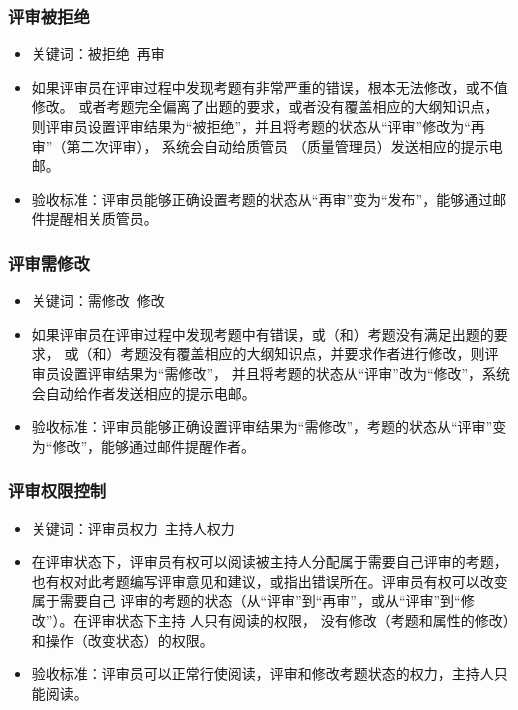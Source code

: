\documentclass[hyperref, a4paper]{ctexart}
\providecommand{\tightlist}{%
  \setlength{\itemsep}{0pt}\setlength{\parskip}{0pt}}
\begin{document}
\hypertarget{ux8bc4ux5ba1ux88abux62d2ux7edd}{%
\subsubsection{评审被拒绝}\label{ux8bc4ux5ba1ux88abux62d2ux7edd}}

\begin{itemize}
\tightlist
\item
  关键词：被拒绝~再审
\item
  如果评审员在评审过程中发现考题有非常严重的错误，根本无法修改，或不值修改。
  或者考题完全偏离了出题的要求，或者没有覆盖相应的大纲知识点，
  则评审员设置评审结果为``被拒绝''，并且将考题的状态从``评审''修改为``再审''（第二次评审），
  系统会自动给质管员 （质量管理员）发送相应的提示电邮。
\item
  验收标准：评审员能够正确设置考题的状态从``再审''变为``发布''，能够通过邮件提醒相关质管员。
\end{itemize}

\hypertarget{ux8bc4ux5ba1ux9700ux4feeux6539}{%
\subsubsection{评审需修改}\label{ux8bc4ux5ba1ux9700ux4feeux6539}}

\begin{itemize}
\tightlist
\item
  关键词：需修改~修改
\item
  如果评审员在评审过程中发现考题中有错误，或（和）考题没有满足出题的要求，
  或（和）考题没有覆盖相应的大纲知识点，并要求作者进行修改，则评审员设置评审结果为``需修改''，
  并且将考题的状态从``评审''改为``修改''，系统会自动给作者发送相应的提示电邮。
\item
  验收标准：评审员能够正确设置评审结果为``需修改''，考题的状态从``评审''变为``修改''，能够通过邮件提醒作者。
\end{itemize}

\hypertarget{ux8bc4ux5ba1ux6743ux9650ux63a7ux5236}{%
\subsubsection{评审权限控制}\label{ux8bc4ux5ba1ux6743ux9650ux63a7ux5236}}

\begin{itemize}
\tightlist
\item
  关键词：评审员权力~主持人权力
\item
  在评审状态下，评审员有权可以阅读被主持人分配属于需要自己评审的考题，
  也有权对此考题编写评审意见和建议，或指出错误所在。评审员有权可以改变属于需要自己
  评审的考题的状态（从``评审''到``再审''，或从``评审''到``修改''）。在评审状态下主持
  人只有阅读的权限，
  没有修改（考题和属性的修改）和操作（改变状态）的权限。
\item
  验收标准：评审员可以正常行使阅读，评审和修改考题状态的权力，主持人只能阅读。
\end{itemize}
\end{document}
